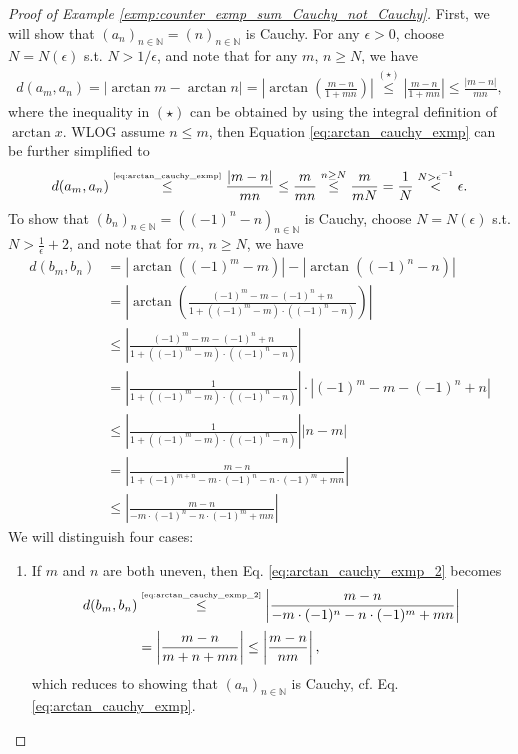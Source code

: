 \documentclass[12pt, a4paper]{article}
\numberwithin{equation}{section}
\theoremstyle{definition}
\theoremstyle{definition}
\newcommand{\abs}[1]{\left\vert #1 \right\vert}
\newcommand{\seq}[1][\varphi]{\left( #1 \right)_{n \in \mathbb{N}}}
\begin{document}
	\begin{proof}[Proof of Example \ref{exmp:counter_exmp_sum_Cauchy_not_Cauchy}]
		First, we will show that $\seq[a_n] = \seq[n]$ is Cauchy. For any $\epsilon > 0$, choose $N = N(\epsilon)$ s.t. $N > 1/\epsilon$, and note that for any $m$, $n\geq N$, we have
		\begin{align}\label{eq:arctan_cauchy_exmp}
			d(a_m, a_n) = \abs{\arctan m - \arctan n} = \abs{\arctan\left(\frac{m - n}{1 + mn}\right)} \overset{(\star)}{\leq} \abs{\frac{m - n}{1 + mn}} \leq \frac{\abs{m - n}}{mn},
		\end{align}
		where the inequality in $(\star)$ can be obtained by using the integral definition of $\arctan x$. WLOG assume $n\leq m$, then Equation \eqref{eq:arctan_cauchy_exmp} can be further simplified to
		\begin{align*}
			d(a_m, a_n) \overset{\tiny\eqref{eq:arctan_cauchy_exmp}}{\leq} \frac{\abs{m - n}}{mn} \leq \frac{m}{mn} \overset{n\geq N}{\leq}\frac{m}{mN} = \frac{1}{N} \overset{N > \epsilon^{-1}}{<} \epsilon. 
		\end{align*}
		To show that $\seq[b_n] = \seq[(-1)^n - n]$ is Cauchy, choose $N = N(\epsilon)$ s.t. $N > \frac{1}{\epsilon} + 2$, and note that for $m$, $n\geq N$, we have
		\begin{align}
			d(b_m, b_n) &= \abs{\arctan\left((-1)^m - m\right)} - \abs{\arctan\left((-1)^n - n\right)} \\[2pt] &= \abs{\arctan\left( \frac{(-1)^m - m - (-1)^n+n}{1 + \left((-1)^m - m\right) \cdot \left((-1)^n -n\right) } \right)} 
			\\[2pt] &\leq \abs{\frac{(-1)^m - m - (-1)^n+n}{1 + \left((-1)^m - m\right) \cdot \left((-1)^n -n\right) }} 
			\\[2pt] &= \abs{\frac{1}{1 + \left((-1)^m - m\right) \cdot \left((-1)^n -n\right)}}\cdot \abs{(-1)^m - m - (-1)^n+n}
			\\[2pt] &\leq  \abs{\frac{1}{1 + \left((-1)^m - m\right) \cdot \left((-1)^n -n\right)}}\abs{n - m} 
			\\[2pt] &= \abs{\frac{m - n}{1 + (-1)^{m + n} - m \cdot (-1)^n -n\cdot (-1)^m + mn}}
			\\[2pt] &\leq \abs{\frac{m - n}{- m \cdot (-1)^n -n\cdot (-1)^m + mn}} \label{eq:arctan_cauchy_exmp_2}
		\end{align}
		We will distinguish four cases:
		\begin{enumerate}
			\item If $m$ and $n$ are both uneven, then Eq. \eqref{eq:arctan_cauchy_exmp_2} becomes 
			\begin{align*}
				d(b_m, b_n) &\overset{\tiny\eqref{eq:arctan_cauchy_exmp_2}}{\leq} \abs{\frac{m - n}{- m \cdot (-1)^n -n\cdot (-1)^m + mn}}
				\\[2pt] &= \abs{\frac{m - n}{m + n + mn}} \leq \abs{\frac{m - n}{nm}},
			\end{align*}
			which reduces to showing that $\seq[a_n]$ is Cauchy, cf. Eq. \eqref{eq:arctan_cauchy_exmp}.
			

\end{enumerate}
\end{proof}
\end{document}
